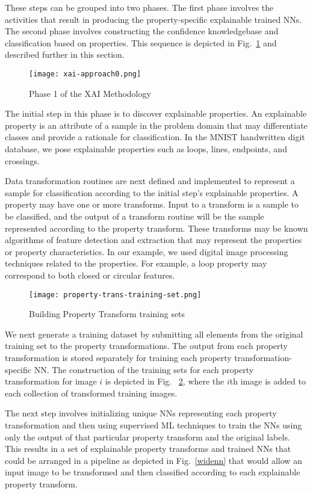 \documentclass[conference]{IEEEtran}
\begin{document}
These steps can be grouped into two phases.   The first phase involves the activities that result in producing the property-specific explainable trained NNs.  The second phase involves constructing the confidence knowledgebase and classification based on properties.  This sequence is depicted in Fig.~\ref{xaimeth} and described further in this section.

\begin{figure}[htbp]
\centerline{\texttt{[image: xai-approach0.png]}}
\caption{Phase 1 of the XAI Methodology}
\label{xaimeth}
\end{figure}

The initial step in this phase is to discover explainable properties.  An explainable property is an attribute of a sample in the problem domain that may differentiate classes and provide a rationale for classification.  In the MNIST handwritten digit database, we pose explainable properties such as loops, lines, endpoints, and crossings.

Data transformation routines are next defined and implemented to represent a sample for classification according to the initial step's explainable properties.  A property may have one or more transforms.  Input to a transform is a sample to be classified, and the output of a transform routine will be the sample represented according to the property transform.  These transforms may be known algorithms of feature detection and extraction that may represent the properties or property characteristics.  In our example, we used digital image processing techniques related to the properties.  For example, a loop property may correspond to both closed or circular features. 

\begin{figure}[htbp]
\centerline{\texttt{[image: property-trans-training-set.png]}}
\caption{Building Property Transform training sets}
\label{proptranstrain}
\end{figure}

We next generate a training dataset by submitting all elements from the original training set to the property transformations.  The output from each property transformation is stored separately for training each property transformation-specific NN.  The construction of the training sets for each property transformation for image $i$ is depicted in Fig. ~\ref{proptranstrain}, where the $i$th image is added to each collection of transformed training images.

The next step involves initializing unique NNs representing each property transformation and then using supervised ML techniques to train the NNs using only the output of that particular property transform and the original labels.  This results in a set of explainable property transforms and trained NNs that could be arranged in a pipeline as depicted in Fig.~\ref{widenn} that would allow an input image to be transformed and then classified according to each explainable property transform. 
\end{document}
